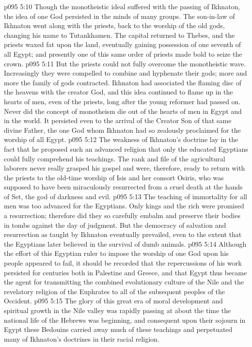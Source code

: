 \pc \vs p095 5:10 Though the monotheistic ideal suffered with the passing of Ikhnaton, the idea of one God persisted in the minds of many groups. The son\hyp{}in\hyp{}law of Ikhnaton went along with the priests, back to the worship of the old gods, changing his name to Tutankhamen. The capital returned to Thebes, and the priests waxed fat upon the land, eventually gaining possession of one seventh of all Egypt; and presently one of this same order of priests made bold to seize the crown.
\vs p095 5:11 But the priests could not fully overcome the monotheistic wave. Increasingly they were compelled to combine and hyphenate their gods; more and more the family of gods contracted. Ikhnaton had associated the flaming disc of the heavens with the creator God, and this idea continued to flame up in the hearts of men, even of the priests, long after the young reformer had passed on. Never did the concept of monotheism die out of the hearts of men in Egypt and in the world. It persisted even to the arrival of the Creator Son of that same divine Father, the one God whom Ikhnaton had so zealously proclaimed for the worship of all Egypt.
\vs p095 5:12 The weakness of Ikhnaton’s doctrine lay in the fact that he proposed such an advanced religion that only the educated Egyptians could fully comprehend his teachings. The rank and file of the agricultural laborers never really grasped his gospel and were, therefore, ready to return with the priests to the old\hyp{}time worship of Isis and her consort Osiris, who was supposed to have been miraculously resurrected from a cruel death at the hands of Set, the god of darkness and evil.
\vs p095 5:13 The teaching of immortality for all men was too advanced for the Egyptians. Only kings and the rich were promised a resurrection; therefore did they so carefully embalm and preserve their bodies in tombs against the day of judgment. But the democracy of salvation and resurrection as taught by Ikhnaton eventually prevailed, even to the extent that the Egyptians later believed in the survival of dumb animals.
\pc \vs p095 5:14 Although the effort of this Egyptian ruler to impose the worship of one God upon his people appeared to fail, it should be recorded that the repercussions of his work persisted for centuries both in Palestine and Greece, and that Egypt thus became the agent for transmitting the combined evolutionary culture of the Nile and the revelatory religion of the Euphrates to all of the subsequent peoples of the Occident.
\vs p095 5:15 The glory of this great era of moral development and spiritual growth in the Nile valley was rapidly passing at about the time the national life of the Hebrews was beginning, and consequent upon their sojourn in Egypt these Bedouins carried away much of these teachings and perpetuated many of Ikhnaton’s doctrines in their racial religion.\plusone
